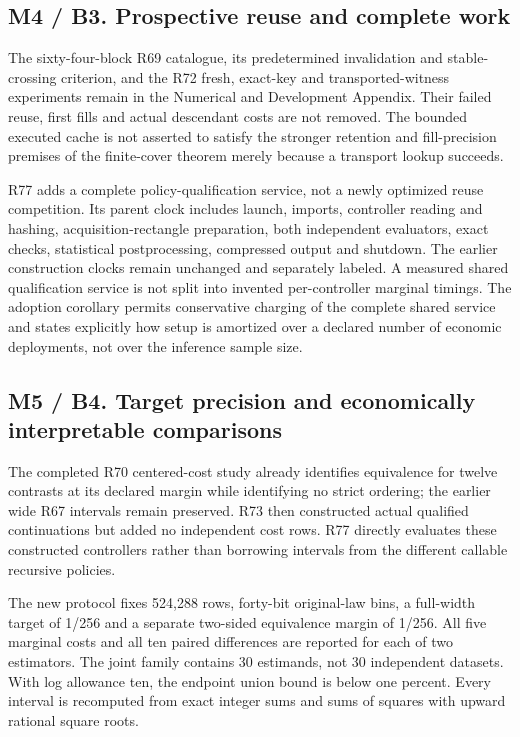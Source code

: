 \documentclass[ecta,nameyear,draft]{econsocart}
\begin{document}
\hypertarget{m4-b3.-prospective-reuse-and-complete-work}{%
\subsection{M4 / B3. Prospective reuse and complete
work}\label{m4-b3.-prospective-reuse-and-complete-work}}

The sixty-four-block R69 catalogue, its predetermined invalidation and
stable-crossing criterion, and the R72 fresh, exact-key and
transported-witness experiments remain in the Numerical and Development
Appendix. Their failed reuse, first fills and actual descendant costs
are not removed. The bounded executed cache is not asserted to satisfy
the stronger retention and fill-precision premises of the finite-cover
theorem merely because a transport lookup succeeds.

R77 adds a complete policy-qualification service, not a newly optimized
reuse competition. Its parent clock includes launch, imports, controller
reading and hashing, acquisition-rectangle preparation, both independent
evaluators, exact checks, statistical postprocessing, compressed output
and shutdown. The earlier construction clocks remain unchanged and
separately labeled. A measured shared qualification service is not split
into invented per-controller marginal timings. The adoption corollary
permits conservative charging of the complete shared service and states
explicitly how setup is amortized over a declared number of economic
deployments, not over the inference sample size.

\hypertarget{m5-b4.-target-precision-and-economically-interpretable-comparisons}{%
\subsection{M5 / B4. Target precision and economically interpretable
comparisons}\label{m5-b4.-target-precision-and-economically-interpretable-comparisons}}

The completed R70 centered-cost study already identifies equivalence for
twelve contrasts at its declared margin while identifying no strict
ordering; the earlier wide R67 intervals remain preserved. R73 then
constructed actual qualified continuations but added no independent cost
rows. R77 directly evaluates these constructed controllers rather than
borrowing intervals from the different callable recursive policies.

The new protocol fixes 524,288 rows, forty-bit original-law bins, a
full-width target of 1/256 and a separate two-sided equivalence margin
of 1/256. All five marginal costs and all ten paired differences are
reported for each of two estimators. The joint family contains 30
estimands, not 30 independent datasets. With log allowance ten, the
endpoint union bound is below one percent. Every interval is recomputed
from exact integer sums and sums of squares with upward rational square
roots.
\end{document}
